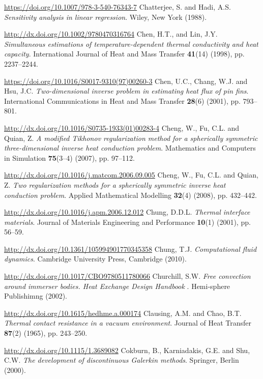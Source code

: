 \begin{thebibliography}{301}
\url{https://doi.org/10.1007/978-3-540-76343-7}
%
%
 Chatterjee, S. and Hadi, A.S. {\it Sensitivity analysis in linear regression}. Wiley, New York (1988). 

\url{http://dx.doi.org/10.1002/9780470316764}
%
%
 Chen, H.T., and Lin, J.Y. {\it Simultaneous estimations of temperature-dependent thermal conductivity and heat capacity}. International Journal of Heat and Mass Transfer {\bf 41}(14) (1998), pp. 2237--2244.

\url{https://doi.org/10.1016/S0017-9310(97)00260-3}
%
%
 Chen, U.C., Chang, W.J. and Hsu, J.C. {\it Two-dimensional inverse problem in estimating heat flux of pin fins}. International Communications in Heat and Mass Transfer {\bf 28}(6) (2001), pp. 793--801.

\url{http://dx.doi.org/10.1016/S0735-1933(01)00283-4}
%
%
 Cheng, W., Fu, C.L. and Quian, Z. {\it A modified Tikhonov regularization method for a spherically symmetric three-dimensional inverse heat conduction problem}. Mathematics and Computers in Simulation {\bf 75}(3--4) (2007), pp. 97--112.

\url{http://dx.doi.org/10.1016/j.matcom.2006.09.005}
%
%
 Cheng, W., Fu, C.L. and Quian, Z. {\it Two regularization methods for a spherically symmetric inverse heat conduction problem}. Applied Mathematical Modelling {\bf 32}(4) (2008), pp. 432--442.

\url{http://dx.doi.org/10.1016/j.apm.2006.12.012}
%
%
 Chung, D.D.L. {\it Thermal interface materials}. Journal of Materials Engineering and Performance {\bf 10}(1) (2001), pp. 56--59.

\url{http://dx.doi.org/10.1361/105994901770345358}
%
%
 Chung, T.J. {\it Computational fluid dynamics}. Cambridge University Press, Cambridge (2010). 

\url{http://dx.doi.org/10.1017/CBO9780511780066}
%
%
 Churchill, S.W. {\it Free convection around immerser bodies. Heat Exchange Design Handbook }. Hemi-sphere Publishimng (2002).

\url{http://dx.doi.org/10.1615/hedhme.a.000174}
%
%
 Clausing, A.M. and Chao, B.T. {\it Thermal contact resistance in a vacuum environment}. Journal of Heat Transfer {\bf 87}(2) (1965), pp. 243--250.

\url{http://dx.doi.org/10.1115/1.3689082}
%
%
 Cokburn, B., Karniadakis, G.E. and Shu, C.W. {\it The development of discontinuous Galerkin methods}. Springer, Berlin (2000).


\end{thebibliography}
